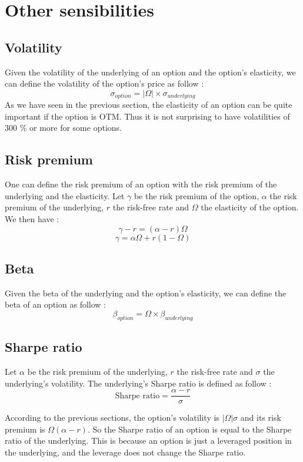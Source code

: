 \documentclass[hidelinks]{article}
\begin{document}
\newpage
\section{Other sensibilities}
\subsection{Volatility}

Given the volatility of the underlying of an option and the option's elasticity, we can define the volatility of the option's price as follow :
$$ \sigma_{option} = |\Omega| \times \sigma_{underlying} $$
As we have seen in the previous section, the elasticity of an option can be quite important if the option is OTM. Thus it is not surprising to have volatilities of 300 \% or more for some options.

\subsection{Risk premium}

One can define the risk premium of an option with the risk premium of the underlying and the elasticity. Let $\gamma$ be the risk premium of the option, $\alpha$ the risk premium of the underlying, $r$ the risk-free rate and $\Omega$ the elasticity of the option. We then have :
$$\gamma - r = (\alpha - r) \Omega $$
$$\gamma = \alpha \Omega + r(1-\Omega)$$

\subsection{Beta}

Given the beta of the underlying and the option's elasticity, we can define the beta of an option as follow :
$$\beta_{option} = \Omega \times \beta_{underlying} $$

\subsection{Sharpe ratio}

Let $\alpha$ be the risk premium of the underlying, $r$ the risk-free rate and $\sigma$ the underlying's volatility.
The underlying's Sharpe ratio is defined as follow :
$$\text{Sharpe ratio} = \frac{\alpha - r}{\sigma} $$

According to the previous sections, the option's volatility is $|\Omega|\sigma$ and its risk premium is $\Omega (\alpha - r)$. So the Sharpe ratio of an option is equal to the Sharpe ratio of the underlying. This is because an option is just a leveraged position in the underlying, and the leverage does not change the Sharpe ratio.
\end{document}
